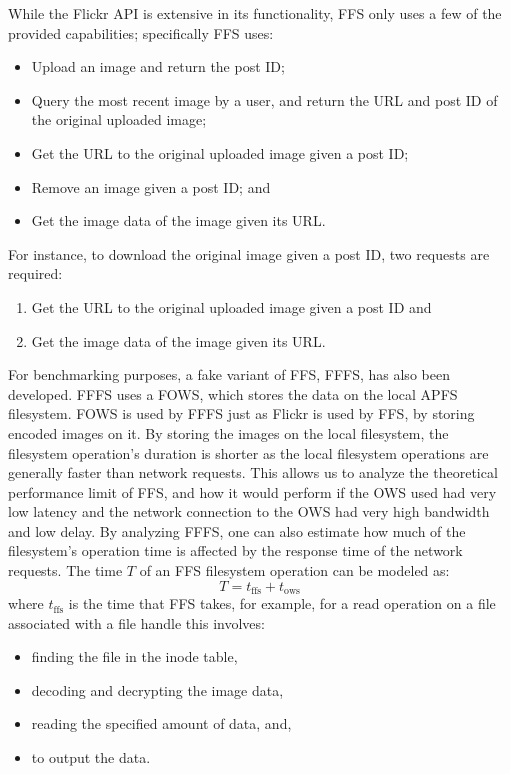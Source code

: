 While the Flickr \gls{API} is extensive in its functionality, \gls{FFS} only uses a few of the provided capabilities; specifically \gls{FFS} uses:
\begin{itemize}
	\item Upload an image and return the post ID;
	\item Query the most recent image by a user, and return the URL and post ID of the original uploaded image;
	\item Get the URL to the original uploaded image given a post ID;
	\item Remove an image given a post ID; and
	\item Get the image data of the image given its URL.
\end{itemize}

For instance, to download the original image given a post ID, two requests are required:
\begin{enumerate}
	\item Get the URL to the original uploaded image given a post ID and
	\item Get the image data of the image given its URL.
\end{enumerate}
For benchmarking purposes, a fake variant of \gls{FFS}, \gls{FFFS}, has also been developed. \gls{FFFS} uses a \gls{FOWS}, which stores the data on the local \gls{APFS} filesystem. \gls{FOWS} is used by \gls{FFFS} just as Flickr is used by \gls{FFS}, by storing encoded images on it. By storing the images on the local filesystem, the filesystem operation's duration is shorter as the local filesystem operations are generally faster than network requests. This allows us to analyze the theoretical performance limit of \gls{FFS}, and how it would perform if the \gls{OWS} used had very low latency and the network connection to the \gls{OWS} had very high bandwidth and low delay. By analyzing \gls{FFFS}, one can also estimate how much of the filesystem's operation time is affected by the response time of the network requests. The time $T$ of an \gls{FFS} filesystem operation can be modeled as:
$$
	T = t_\text{ffs} + t_\text{ows}
$$
where $t_\text{ffs}$ is the time that \gls{FFS} takes, for example, for a read operation on a file associated with a file handle this involves:
\begin{itemize}
	\item finding the file in the inode table,
	\item decoding and decrypting the image data,
	\item reading the specified amount of data, and,
	\item to output the data.
\end{itemize}
